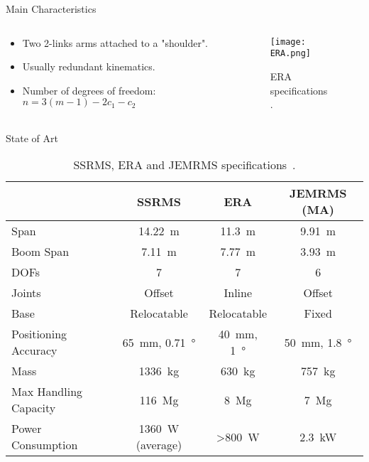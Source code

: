 \begin{frame}{Main Characteristics}
\begin{columns}
    \begin{column}{0.5\textwidth}
    \begin{itemize}
        \item Two 2-links arms attached to a "shoulder".
        \item Usually redundant kinematics.
        \item Number of degrees of freedom: $n=3(m-1)-2c_1-c_2$
    \end{itemize}
    
    \end{column}
    \begin{column}{0.5\textwidth}
        \begin{figure}
            \centering
            \texttt{[image: ERA.png]}
            \caption{ERA specifications~\cite{era}.}
        \end{figure}
    \end{column}
\end{columns}
\end{frame}

\begin{frame}{State of Art}
    \begin{table}
    \centering
        \begin{tabular}{lccc}
            \hline
        & \textbf{SSRMS} & \textbf{ERA} & \textbf{JEMRMS (MA)}\\
        \hline
        Span&\SI{14.22}{\metre}&\SI{11.3}{\metre}&\SI{9.91}{\metre}\\
        Boom Span&\SI{7.11}{\metre}&\SI{7.77}{\metre}&\SI{3.93}{\metre}\\
        DOFs&7&7&6\\
        Joints&Offset&Inline&Offset\\
        Base&Relocatable&Relocatable&Fixed\\
        Positioning Accuracy&\SI{65}{\milli\metre}, \SI{0.71}{\degree}&\SI{40}{\milli\metre}, \SI{1}{\degree}&\SI{50}{\milli\metre}, \SI{1.8}{\degree}\\
        Mass&\SI{1336}{\kilogram}&\SI{630}{\kilogram}&\SI{757}{\kilogram}\\
        Max Handling Capacity&\SI{116}{\mega\gram}&\SI{8}{\mega\gram}&\SI{7}{\mega\gram}\\
        Power Consumption&\SI{1360}{\watt} (average)&>\SI{800}{\watt}&\SI{2.3}{\kilo\watt}\\
        \hline
        \end{tabular}
    \caption{SSRMS, ERA and JEMRMS specifications~\cite{comparison}.}
    \end{table}
\end{frame}
